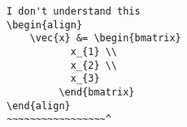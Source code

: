 \begin{verbatim}
I don't understand this
\begin{align}
    \vec{x} &= \begin{bmatrix}
           x_{1} \\
           x_{2} \\
           x_{3}
         \end{bmatrix}
\end{align}
~~~~~~~~~~~~~~~~~^
\end{verbatim}
